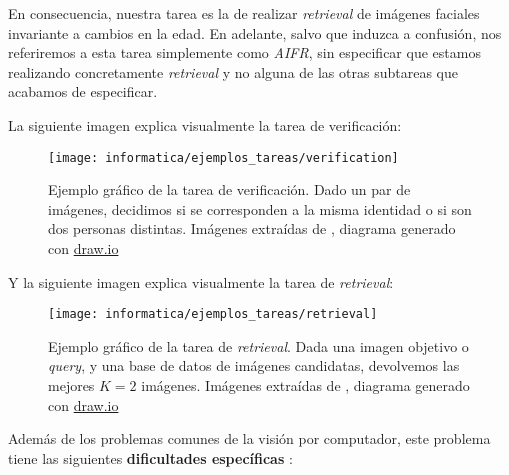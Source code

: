 \begin{itemize}
\end{itemize}

En consecuencia, nuestra tarea es la de realizar \textit{retrieval} de imágenes faciales invariante a cambios en la edad. En adelante, salvo que induzca a confusión, nos referiremos a esta tarea simplemente como \textit{AIFR}, sin especificar que estamos realizando concretamente \textit{retrieval} y no alguna de las otras subtareas que acabamos de especificar.

La siguiente imagen explica visualmente la tarea de verificación:

\begin{figure}[H]
    \centering
    \texttt{[image: informatica/ejemplos\_tareas/verification]}
    \caption{Ejemplo gráfico de la tarea de verificación. Dado un par de imágenes, decidimos si se corresponden a la misma identidad o si son dos personas distintas. Imágenes extraídas de \cite{informatica:cacd_dataset}, diagrama generado con \url{draw.io}}
\end{figure}

Y la siguiente imagen explica visualmente la tarea de \textit{retrieval}:

\begin{figure}[H]
    \centering
    \texttt{[image: informatica/ejemplos\_tareas/retrieval]}
    \caption{Ejemplo gráfico de la tarea de \textit{retrieval}. Dada una imagen objetivo o \textit{query}, y una base de datos de imágenes candidatas, devolvemos las mejores $K = 2$ imágenes. Imágenes extraídas de \cite{informatica:cacd_dataset}, diagrama generado con \url{draw.io}}
\end{figure}

Además de los problemas comunes de la visión por computador, este problema tiene las siguientes \textbf{dificultades específicas} \cite{informatica:challenges_retrieval}:

